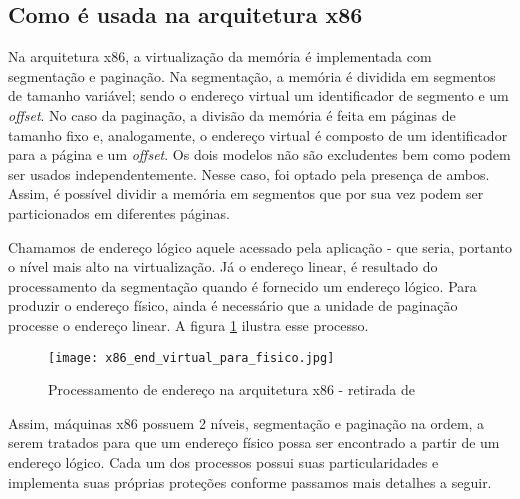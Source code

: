 		\subsection{Como é usada na arquitetura x86}		
			Na arquitetura x86, a virtualização da memória é implementada com segmentação e paginação.
			Na segmentação, a memória é dividida em segmentos de tamanho variável; sendo o endereço
			virtual um identificador de segmento e um \textsl{offset}. No caso da paginação,
			a divisão da memória é feita em páginas de tamanho fixo e, analogamente, o endereço
			virtual é composto de um identificador para a página e um \textsl{offset}.
			Os dois modelos não são excludentes bem como podem ser usados independentemente.
			Nesse caso, foi optado pela presença de ambos. Assim, é possível dividir 
			a memória em segmentos que por sua vez podem ser particionados em diferentes páginas.
			
			
			Chamamos de endereço lógico aquele acessado pela aplicação - que seria, portanto
			o nível mais alto na virtualização. Já o endereço linear, é resultado do processamento
			da segmentação quando é fornecido um endereço lógico.
			Para produzir o endereço físico, ainda é necessário que a unidade de paginação
			processe o endereço linear. A figura \ref{fig:x86_end_virtual_para_fisico} ilustra esse processo.

			\begin{figure}
				\begin{center}
					\texttt{[image: x86\_end\_virtual\_para\_fisico.jpg]}
					\caption{Processamento de endereço na arquitetura x86 - retirada de \cite{Bovet2005}}
					\label{fig:x86_end_virtual_para_fisico}
				\end{center}
			\end{figure}
			
			
			Assim, máquinas x86 possuem 2 níveis, segmentação e paginação na ordem, 
			a serem tratados para que um endereço físico possa ser encontrado a partir de um endereço lógico. 
			Cada um dos processos possui suas particularidades e implementa suas 
			próprias proteções conforme passamos mais detalhes a seguir.
		
		

